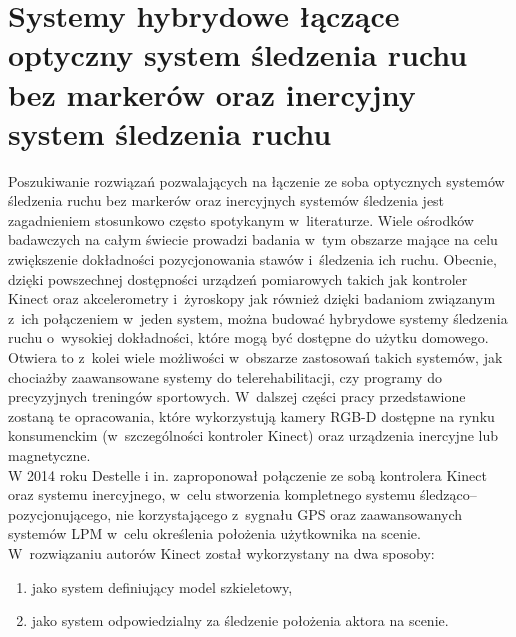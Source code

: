 		
		
\section{Systemy hybrydowe łączące optyczny system śledzenia ruchu bez markerów oraz inercyjny system śledzenia ruchu}
Poszukiwanie rozwiązań pozwalających na łączenie ze soba optycznych systemów śledzenia ruchu bez markerów oraz inercyjnych systemów śledzenia jest zagadnieniem stosunkowo często spotykanym w~literaturze. Wiele ośrodków badawczych na całym świecie prowadzi badania w~tym obszarze mające na celu zwiększenie dokładności pozycjonowania stawów i~śledzenia ich ruchu. Obecnie, dzięki powszechnej dostępności urządzeń pomiarowych takich jak kontroler Kinect oraz akcelerometry i~żyroskopy jak również dzięki badaniom związanym z~ich połączeniem w~jeden system, można budować hybrydowe systemy śledzenia ruchu o~wysokiej dokładności, które mogą być dostępne do użytku domowego. Otwiera to z~kolei wiele możliwości w~obszarze zastosowań takich systemów, jak chociażby zaawansowane systemy do telerehabilitacji, czy programy do precyzyjnych treningów sportowych. W~dalszej części pracy przedstawione zostaną te opracowania, które wykorzystują kamery RGB-D dostępne na rynku konsumenckim (w~szczególności kontroler Kinect) oraz urządzenia inercyjne lub magnetyczne. \\
W 2014 roku Destelle i in. \cite{Destelle2014} zaproponował połączenie ze sobą kontrolera Kinect oraz systemu inercyjnego, w~celu stworzenia kompletnego systemu śledząco--pozycjonującego, nie korzystającego z~sygnału GPS oraz zaawansowanych systemów LPM w~celu określenia położenia użytkownika na scenie. W~rozwiązaniu autorów Kinect został wykorzystany na dwa sposoby:
\begin{enumerate}
	\item jako system definiujący model szkieletowy,
	\item jako system odpowiedzialny za śledzenie położenia aktora na scenie.
\end{enumerate}
		
